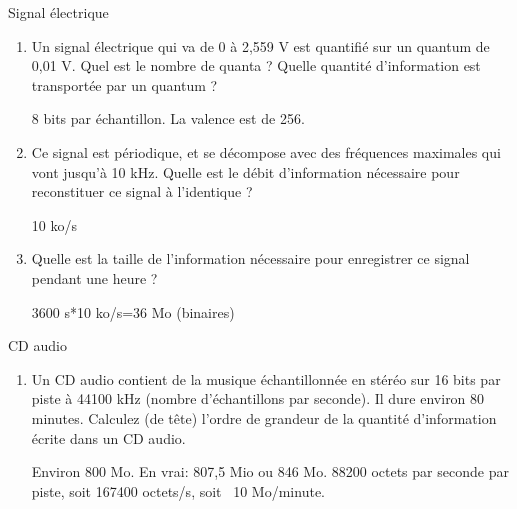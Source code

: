\begin{exercice}
  \begin{exercicelet}{Signal électrique}
    \begin{enumerate}
    \item Un signal électrique qui va de 0 à 2,559 V est quantifié sur un quantum
      de 0,01 V. Quel est le nombre de quanta ? Quelle quantité d'information
      est transportée par un quantum ?
      \begin{xcorrection}
        8 bits par échantillon. La valence est de 256.
      \end{xcorrection}
    \item Ce signal est périodique, et se décompose avec des fréquences
      maximales qui vont jusqu'à 10 kHz. Quelle est le débit d'information
      nécessaire pour reconstituer ce signal à l'identique ?
      \begin{xcorrection}
        10 ko/s
      \end{xcorrection}
    \item Quelle est la taille de l'information nécessaire pour enregistrer ce
      signal pendant une heure ?
      \begin{xcorrection}
        3600 s*10 ko/s=36 Mo (binaires)
      \end{xcorrection}
    \end{enumerate}
  \end{exercicelet}
  \begin{exercicelet}{CD audio}
    \begin{enumerate}
    \item Un CD audio contient de la musique échantillonnée en stéréo sur 16
      bits par piste à 44100 kHz (nombre d'échantillons par seconde). Il dure
      environ 80 minutes. Calculez (de tête) l'ordre de grandeur de la
      quantité d'information écrite dans un CD audio.
      \begin{xcorrection}
        Environ 800 Mo. En vrai: 807,5 Mio ou 846 Mo.
        88200 octets par seconde par piste, soit 167400 octets/s, soit ~10 Mo/minute.
      \end{xcorrection}
    \end{enumerate}
  \end{exercicelet}
\end{exercice}


